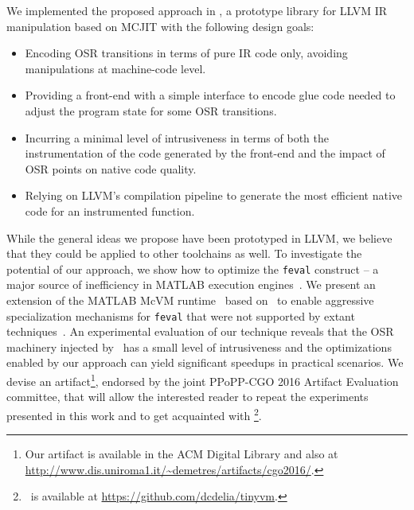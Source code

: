 \noindent We implemented the proposed approach in \osrkit, a prototype library for LLVM IR manipulation based on MCJIT with the following design goals:
\begin{itemize}
\item Encoding OSR transitions in terms of pure IR code only, avoiding manipulations at machine-code level.
\item Providing a front-end with a simple interface to encode glue code needed to adjust the program state for some OSR transitions.
\item Incurring a minimal level of intrusiveness in terms of both the instrumentation of the code generated by the front-end and the impact of OSR points on native code quality.
\item Relying on LLVM's compilation pipeline to generate the most efficient native code for an instrumented function.
\end{itemize}


\noindent While the general ideas we propose have been prototyped in LLVM, we believe that they could be applied to other toolchains as well. To investigate the potential of our approach, we show how to optimize the {\tt feval} construct -- a major source of inefficiency in MATLAB execution engines~\cite{lameed2013feval, radpour2013refactoring}. We present an extension of the MATLAB McVM runtime~\cite{chevalier2010mcvm} based on \osrkit\ to enable aggressive specialization mechanisms for {\tt feval} that were not supported by extant techniques~\cite{lameed2013feval}. An experimental evaluation of our technique reveals that the OSR machinery injected by \osrkit\ has a small level of intrusiveness and the optimizations enabled by our approach can yield significant speedups in practical scenarios. We devise an artifact\footnote{Our artifact is available in the ACM Digital Library and also at\\ \url{http://www.dis.uniroma1.it/~demetres/artifacts/cgo2016/}.}, endorsed by the joint PPoPP-CGO 2016 Artifact Evaluation committee, that will allow the interested reader to repeat the experiments presented in this work and to get acquainted with \osrkit\footnote{\osrkit\ is available at \url{https://github.com/dcdelia/tinyvm}.}.

